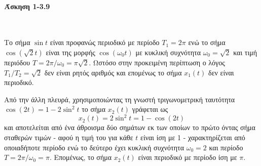\documentclass[a4paper,twoside,10pt,openany]{memoir}
\theoremstyle{dotless}
\newcounter{problem}[section] %
\begin{document}
\pagestyle{empty}


\paragraph {Άσκηση 1-3.9}~\medskip


\begin{solution}
Το σήμα $\sin t$ είναι προφανώς περιοδικό με περίοδο $T_1=2\pi$ ενώ το σήμα $\cos(\sqrt{2}t)$ είναι της μορφής $\cos(\omega_0t)$ με κυκλική συχνότητα $\omega_0=\sqrt{2}$ και τιμή περιόδου $T=2\pi/\omega_0=\pi\sqrt{2}$. Ωστόσο στην προκειμένη περίπτωση ο λόγος $T_1/T_2=\sqrt{2}$ δεν είναι ρητός αριθμός και επομένως το σήμα $x_1(t)$ δεν είναι περιοδικό.\medskip

\noindent Από την άλλη πλευρά, χρησιμοποιώντας τη γνωστή τριγωνομετρική ταυτότητα $\cos(2t)=1-2\sin^2t$ το σήμα $x_2(t)$ γράφεται ως
\begin{equation*}
x_2(t)=2\sin^2t=1-\cos(2t)
\end{equation*}
και αποτελείται από ένα άθροισμα δύο σημάτων εκ των οποίων το πρώτο όντας σήμα σταθερών τιμών - αφού η τιμή του για κάθε $t$ είναι ίση με 1 - χαρακτηρίζεται από οποιαδήποτε περίοδο ενώ το δεύτερο έχει κυκλική συχνότητα $\omega_0=2$ και περίοδο $T=2\pi/\omega_0=\pi$. Επομένως, το σήμα $x_2(t)$ είναι περιοδικό με περίοδο ίση με $\pi$.
\end{solution}
\end{document}
